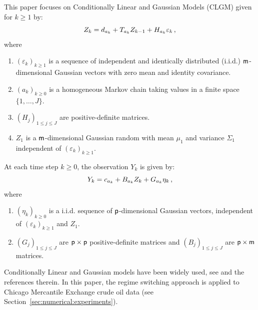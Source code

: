 This paper focuses on  Conditionally Linear and Gaussian Models (CLGM) given for $k\ge 1$ by:
\begin{equation}
\label{eq:model:state}
Z_k = d_{a_{k}} + T_{a_{k}}Z_{k-1}+H_{a_{k}}\varepsilon_k\,,
\end{equation}
where
\begin{enumerate}[-]
\item $(\varepsilon_k)_{k\ge 1}$ is a sequence of independent and identically distributed (i.i.d.) $\mathsf{m}$-dimensional Gaussian vectors with zero mean and identity covariance.
\item $(a_k)_{k\ge 0}$ is a homogeneous Markov chain taking values in a finite space $\{1,\ldots,J\}$.  %
\item $(H_j)_{1\le j\le J}$ are positive-definite matrices.
\item $Z_1$ is a $\mathsf{m}$-dimensional Gaussian random with mean $\mu_1$ and variance $\Sigma_1$ independent of $(\varepsilon_k)_{k\ge 1}$. 
\end{enumerate}
At each time step $k\ge 0$, the observation $Y_k$ is given by:
\begin{equation}
\label{eq:model:obs}
Y_k = c_{a_k} + B_{a_k}Z_k + G_{a_k}\eta_k\,,
\end{equation}
where
\begin{enumerate}[-]
\item $(\eta_k)_{k\ge 0}$ is a i.i.d. sequence of $\mathsf{p}$-dimensional Gaussian vectors, independent of $(\varepsilon_k)_{k\ge 1}$ and $Z_1$.
\item $(G_j)_{1\le j \le J}$ are $\mathsf{p} \times \mathsf{p}$ positive-definite matrices and $(B_j)_{1\le j \le J}$ are $\mathsf{p} \times \mathsf{m}$ matrices.
\end{enumerate}
Conditionally Linear and Gaussian models have been widely used, see \cite{sarkka:2013} and the references therein. In this paper, the regime switching approach is applied to Chicago Mercantile Exchange crude oil data (see Section~\ref{sec:numerical:experiments}).

